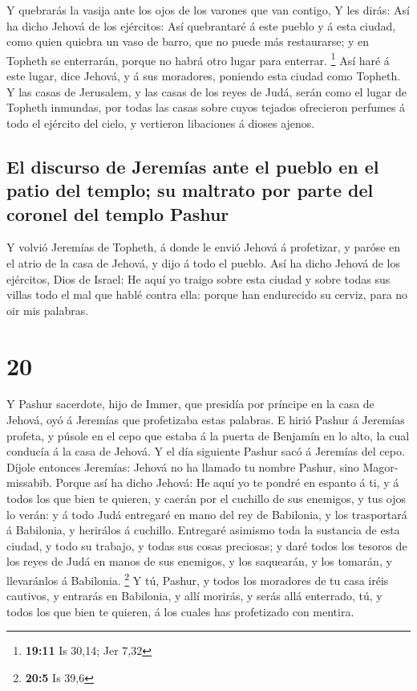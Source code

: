  Y quebrarás la vasija ante los ojos de los varones que
van contigo,  Y les dirás: Así ha dicho Jehová de los
ejércitos: Así quebrantaré á este pueblo y á esta ciudad, como quien
quiebra un vaso de barro, que no puede más restaurarse; y en Topheth se
enterrarán, porque no habrá otro lugar para enterrar. \footnote{\textbf{19:11}
  Is 30,14; Jer 7,32}  Así haré á este lugar, dice
Jehová, y á sus moradores, poniendo esta ciudad como Topheth.
 Y las casas de Jerusalem, y las casas de los reyes de
Judá, serán como el lugar de Topheth inmundas, por todas las casas sobre
cuyos tejados ofrecieron perfumes á todo el ejército del cielo, y
vertieron libaciones á dioses ajenos.

\hypertarget{el-discurso-de-jeremuxedas-ante-el-pueblo-en-el-patio-del-templo-su-maltrato-por-parte-del-coronel-del-templo-pashur}{%
\subsection{El discurso de Jeremías ante el pueblo en el patio del
templo; su maltrato por parte del coronel del templo
Pashur}\label{el-discurso-de-jeremuxedas-ante-el-pueblo-en-el-patio-del-templo-su-maltrato-por-parte-del-coronel-del-templo-pashur}}

 Y volvió Jeremías de Topheth, á donde le envió Jehová á
profetizar, y paróse en el atrio de la casa de Jehová, y dijo á todo el
pueblo.  Así ha dicho Jehová de los ejércitos, Dios de
Israel: He aquí yo traigo sobre esta ciudad y sobre todas sus villas
todo el mal que hablé contra ella: porque han endurecido su cerviz, para
no oir mis palabras.

\hypertarget{section-19}{%
\section{20}\label{section-19}}

 Y Pashur sacerdote, hijo de Immer, que presidía por
príncipe en la casa de Jehová, oyó á Jeremías que profetizaba estas
palabras.  E hirió Pashur á Jeremías profeta, y púsole en
el cepo que estaba á la puerta de Benjamín en lo alto, la cual conducía
á la casa de Jehová.  Y el día siguiente Pashur sacó á
Jeremías del cepo. Díjole entonces Jeremías: Jehová no ha llamado tu
nombre Pashur, sino Magor-missabib.  Porque así ha dicho
Jehová: He aquí yo te pondré en espanto á ti, y á todos los que bien te
quieren, y caerán por el cuchillo de sus enemigos, y tus ojos lo verán:
y á todo Judá entregaré en mano del rey de Babilonia, y los trasportará
á Babilonia, y herirálos á cuchillo.  Entregaré asimismo
toda la sustancia de esta ciudad, y todo su trabajo, y todas sus cosas
preciosas; y daré todos los tesoros de los reyes de Judá en manos de sus
enemigos, y los saquearán, y los tomarán, y llevaránlos á Babilonia.
\footnote{\textbf{20:5} Is 39,6}  Y tú, Pashur, y todos
los moradores de tu casa iréis cautivos, y entrarás en Babilonia, y allí
morirás, y serás allá enterrado, tú, y todos los que bien te quieren, á
los cuales has profetizado con mentira.

